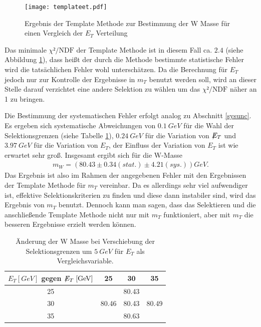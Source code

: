 \documentclass[a4paper,12pt]{article}
\newcommand{\met}{\ensuremath{\not\mathrel{E}}_T}
\begin{document}



\begin{figure}[htb]
	\centering
	\texttt{[image: templateet.pdf]}
	\caption{Ergebnis der Template Methode zur Bestimmung der W Masse für einen Vergleich der $E_{T}$ Verteilung}
	\label{fig:chiet}
\end{figure}
Das minimale $χ²/\text{NDF}$ der Template Methode ist in diesem Fall ca. $2.4$ (siehe Abbildung
\ref{fig:chiet}), dass heißt der durch die Methode bestimmte statistische Fehler wird
die tatsächlichen Fehler wohl unterschätzen. Da die Berechnung für $E_{T}$ jedoch nur zur Kontrolle der Ergebnisse in $m_{T}$ benutzt werden soll,
wird an dieser Stelle darauf verzichtet eine andere Selektion zu wählen um das $χ²/\text{NDF}$ näher an 1 zu bringen.

Die Bestimmung der systematischen Fehler erfolgt analog zu
Abschnitt \ref{sysunc}. Es ergeben sich systematische Abweichungen von $\SI{0.1}{GeV}$ für die Wahl der Selektionsgrenzen (siehe Tabelle \ref{tab:variation_et}), $\SI{0.24}{GeV}$
für die Variation von $\met$ und $\SI{3.97}{GeV}$ für die Variation von $E_{T}$, der Einfluss der Variation von $E_{T}$ ist wie erwartet sehr groß.
Insgesamt ergibt sich für die W-Masse
\begin{align*}
	m_W = ( 80.43 ± 0.34 (stat.)± 4.21 (sys.)) \si{GeV}.
\end{align*}
Das Ergebnis ist also im Rahmen der angegebenen Fehler mit den Ergebnissen der Template Methode für
$m_{T}$ vereinbar.
Da es allerdings sehr viel aufwendiger ist, effektive Selektionskriterien zu finden und diese dann
instabiler sind, wird das Ergebnis von $m_T$ benutzt.
Dennoch kann man sagen, dass das Selektieren und die anschließende Template Methode nicht nur mit
$m_T$ funktioniert, aber mit $m_T$ die besseren Ergebnisse erzielt werden können.
\begin{table}[h]
	\centering
	\begin{tabular}{c| c c c}
		$E_{T} [\si{GeV}]$ gegen $\met[\si{GeV}]$ & 25 & 30 & 35 \\
		\hline
		25 &  & 80.43 & \\
		30 & 80.46 & 80.43 & 80.49 \\
		35 &  & 80.63 &
	\end{tabular}
	\caption{Änderung der W Masse bei Verschiebung der Selektionsgrenzen um $\SI{5}{GeV}$ für $E_T$
als Vergleichsvariable.}
	\label{tab:variation_et}
\end{table}
\end{document}
